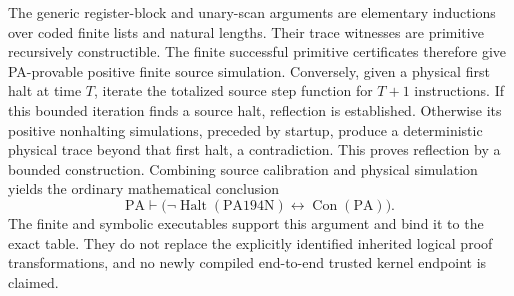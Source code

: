 The generic register-block and unary-scan arguments are elementary
inductions over coded finite lists and natural lengths. Their trace
witnesses are primitive recursively constructible. The finite successful
primitive certificates therefore give PA-provable positive finite source
simulation. Conversely, given a physical first halt at time $T$, iterate the totalized
source step function for $T+1$ instructions. If this bounded iteration
finds a source halt, reflection is established. Otherwise its positive
nonhalting simulations, preceded by startup, produce a deterministic
physical trace beyond that first halt, a contradiction. This proves
reflection by a bounded construction.
Combining source calibration and physical simulation yields the ordinary
mathematical conclusion
\[
 \mathrm{PA}\vdash
 \bigl(\neg\operatorname{Halt}(\mathrm{PA194N})
                 \leftrightarrow\operatorname{Con}(\mathrm{PA})\bigr).
\]
The finite and symbolic executables support this argument and bind it to
the exact table. They do not replace the explicitly identified inherited
logical proof transformations, and no newly compiled end-to-end trusted
kernel endpoint is claimed.

